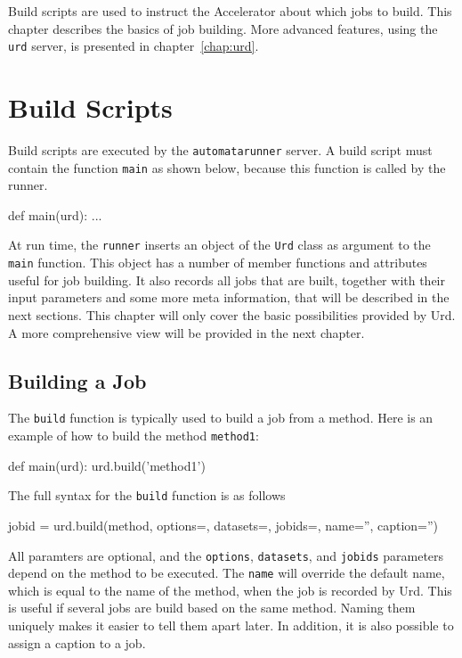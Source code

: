 \label{chap:urd_basic}

Build scripts are used to instruct the Accelerator about which jobs to
build.  This chapter describes the basics of job building.  More
advanced features, using the \texttt{urd} server, is presented in
chapter~\ref{chap:urd}.


\section{Build Scripts}
Build scripts are executed by the \texttt{automatarunner} server.  A build
script must contain the function \texttt{main} as shown below, because
this function is called by the runner.
\begin{python}
def main(urd):
    ...
\end{python}
At run time, the \texttt{runner} inserts an object of the \texttt{Urd}
class as argument to the \texttt{main} function.  This object has a
number of member functions and attributes useful for job building.  It
also records all jobs that are built, together with their input
parameters and some more meta information, that will be described in
the next sections.  This chapter will only cover the basic
possibilities provided by Urd.  A more comprehensive view will be
provided in the next chapter.

\subsection{Building a Job}
The \texttt{build} function is typically used to build a job from a
method.  Here is an example of how to build the method
\texttt{method1}:
\begin{python}
def main(urd):
    urd.build('method1')
\end{python}
The full syntax for the \texttt{build} function is as follows
\begin{python}
jobid = urd.build(method, options={}, datasets={}, jobids={}, name='', caption='')
\end{python}
All paramters are optional, and
the \texttt{options}, \texttt{datasets}, and \texttt{jobids}
parameters depend on the method to be executed.  The \texttt{name}
will override the default name, which is equal to the name of the
method, when the job is recorded by Urd.  This is useful if several
jobs are build based on the same method.  Naming them uniquely makes
it easier to tell them apart later.  In addition, it is also possible
to assign a caption to a job.

